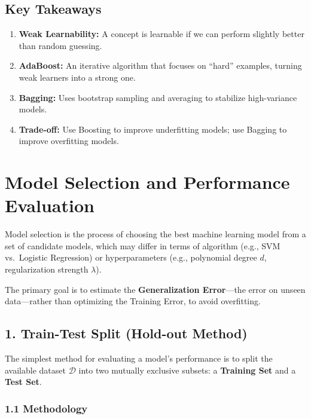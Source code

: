 \documentclass[
  italian,
  11pt,
]{article}
\begin{document}
\subsection{Key Takeaways}\label{key-takeaways-10}

\begin{enumerate}
\def\labelenumi{\arabic{enumi}.}
\item
  \textbf{Weak Learnability:} A concept is learnable if we can perform
  slightly better than random guessing.
\item
  \textbf{AdaBoost:} An iterative algorithm that focuses on ``hard''
  examples, turning weak learners into a strong one.
\item
  \textbf{Bagging:} Uses bootstrap sampling and averaging to stabilize
  high-variance models.
\item
  \textbf{Trade-off:} Use Boosting to improve underfitting models; use
  Bagging to improve overfitting models.

  \newpage
\end{enumerate}

\section{Model Selection and Performance
Evaluation}\label{model-selection-and-performance-evaluation}

Model selection is the process of choosing the best machine learning
model from a set of candidate models, which may differ in terms of
algorithm (e.g., SVM vs.~Logistic Regression) or hyperparameters (e.g.,
polynomial degree \(d\), regularization strength \(\lambda\)).

The primary goal is to estimate the \textbf{Generalization Error}---the
error on unseen data---rather than optimizing the Training Error, to
avoid overfitting.

\subsection{1. Train-Test Split (Hold-out
Method)}\label{train-test-split-hold-out-method}

The simplest method for evaluating a model's performance is to split the
available dataset \(\mathcal{D}\) into two mutually exclusive subsets: a
\textbf{Training Set} and a \textbf{Test Set}.

\subsubsection{1.1 Methodology}\label{methodology}
\end{document}
